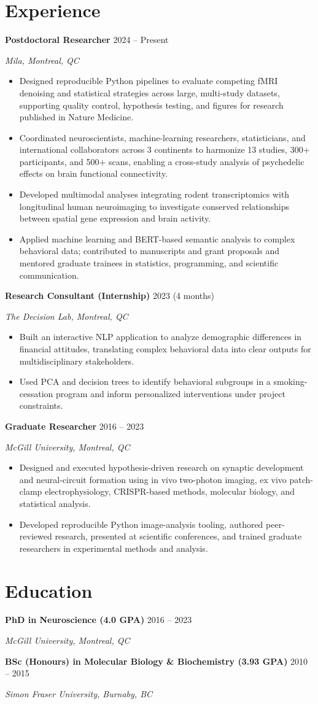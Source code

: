 \documentclass[letterpaper,10pt]{article}
\newcommand{\role}[3]{\textbf{#1} \hfill #3\par\textit{#2}\par}
\begin{document}
\section{Experience}
\role{Postdoctoral Researcher}{Mila, Montreal, QC}{2024 -- Present}
\begin{itemize}
    \item Designed reproducible Python pipelines to evaluate competing fMRI denoising and statistical strategies across large, multi-study datasets, supporting quality control, hypothesis testing, and figures for research published in Nature Medicine.
    \item Coordinated neuroscientists, machine-learning researchers, statisticians, and international collaborators across 3 continents to harmonize 13 studies, 300+ participants, and 500+ scans, enabling a cross-study analysis of psychedelic effects on brain functional connectivity.
    \item Developed multimodal analyses integrating rodent transcriptomics with longitudinal human neuroimaging to investigate conserved relationships between spatial gene expression and brain activity.
    \item Applied machine learning and BERT-based semantic analysis to complex behavioral data; contributed to manuscripts and grant proposals and mentored graduate trainees in statistics, programming, and scientific communication.
\end{itemize}
\vspace{3pt}

\role{Research Consultant (Internship)}{The Decision Lab, Montreal, QC}{2023 (4 months)}
\begin{itemize}
    \item Built an interactive NLP application to analyze demographic differences in financial attitudes, translating complex behavioral data into clear outputs for multidisciplinary stakeholders.
    \item Used PCA and decision trees to identify behavioral subgroups in a smoking-cessation program and inform personalized interventions under project constraints.
\end{itemize}
\vspace{3pt}

\role{Graduate Researcher}{McGill University, Montreal, QC}{2016 -- 2023}
\begin{itemize}
    \item Designed and executed hypothesis-driven research on synaptic development and neural-circuit formation using in vivo two-photon imaging, ex vivo patch-clamp electrophysiology, CRISPR-based methods, molecular biology, and statistical analysis.
    \item Developed reproducible Python image-analysis tooling, authored peer-reviewed research, presented at scientific conferences, and trained graduate researchers in experimental methods and analysis.
\end{itemize}

\section{Education}
\role{PhD in Neuroscience (4.0 GPA)}{McGill University, Montreal, QC}{2016 -- 2023}
\role{BSc (Honours) in Molecular Biology \& Biochemistry (3.93 GPA)}{Simon Fraser University, Burnaby, BC}{2010 -- 2015}
\end{document}
